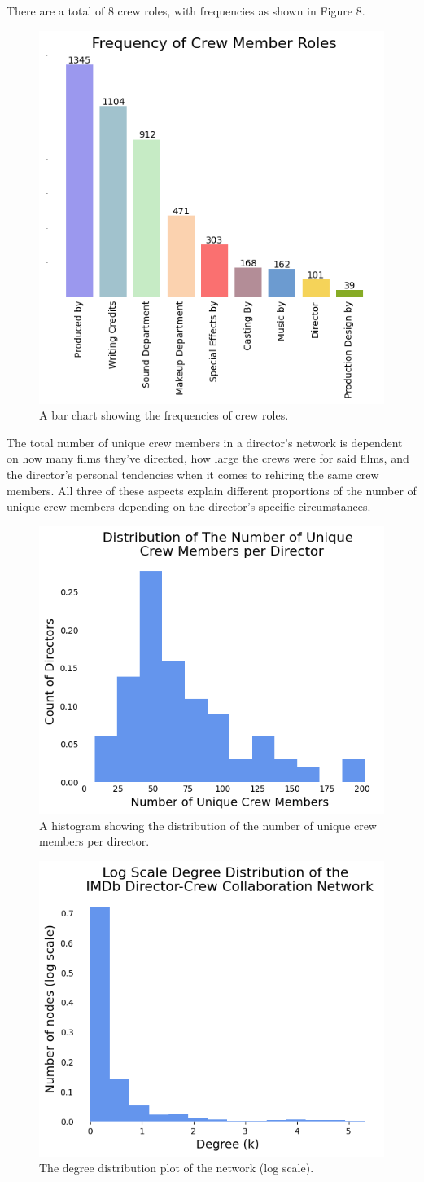 \documentclass[12pt]{article}
\begin{document}
There are a total of 8 crew roles, with frequencies as shown in Figure 8.
\begin{figure}[h!]
    \centering
    \includegraphics[width=0.33\linewidth]{0_crewmember_frequency.png}
    \caption{A bar chart showing the frequencies of crew roles.}
    \label{fig:bar-chart}
\end{figure}

The total number of unique crew members in a director's network is dependent on how many films they've directed, how large the crews were for said films, and the director's personal tendencies when it comes to rehiring the same crew members. All three of these aspects explain different proportions of the number of unique crew members depending on the director's specific circumstances. 
\begin{figure}[h!]
    \centering
    \includegraphics[width=0.33\linewidth]{0_histuniquecrewperdirector.png}
    \caption{A histogram showing the distribution of the number of unique crew members per director.}
    \label{fig:enter-label}
\end{figure}

\begin{figure}[!ht]
    \centering
    \includegraphics[width=0.33\linewidth]{0_degreedistlog.png}
    \caption{The degree distribution plot of the network (log scale).}
    \label{fig:log-label}
\end{figure}
\end{document}

